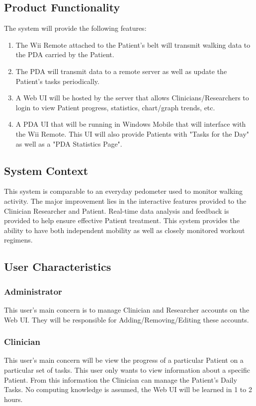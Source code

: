 \documentclass{article}
\begin{document}
\subsection{Product Functionality}	
The system will provide the following features:
\begin{enumerate}
\item The Wii Remote attached to the Patient's belt will transmit walking data to the PDA carried by the Patient.
\item The PDA will transmit data to a remote server as well as update the Patient's tasks periodically. 
\item A Web UI will be hosted by the server that allows Clinicians/Researchers to login to view Patient progress, statistics, chart/graph trends, etc. 
\item A PDA UI that will be running in Windows Mobile that will interface with the Wii Remote. This UI will also provide Patients with "Tasks for the Day" as well as a "PDA Statistics Page".
\end{enumerate}

\subsection{System Context}
This system is comparable to an everyday pedometer used to monitor walking activity. The major improvement lies in the interactive features provided to the Clinician Researcher and Patient. Real-time data analysis and feedback is provided to help ensure effective Patient treatment. This system provides the ability to have both independent mobility as well as closely monitored workout regimens. 

\subsection{User Characteristics}

\subsubsection{Administrator}
This user's main concern is to manage Clinician and Researcher accounts on the Web UI. They will be responsible for Adding/Removing/Editing these accounts.

\subsubsection{Clinician}
This user's main concern will be view the progress of a particular Patient on a particular set of tasks. This user only wants to view information about a specific Patient. From this information the Clinician can manage the Patient's Daily Tasks. No computing knowledge is assumed, the Web UI will be learned in 1 to 2 hours. 
\end{document}
